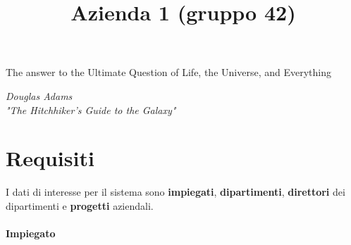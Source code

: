 \documentclass{article}
\title{Azienda 1 (gruppo 42)}
\date{}
\begin{document}
\maketitle

 \epigraph{The answer to the Ultimate Question of Life, the Universe, and Everything}{\textit{Douglas Adams \\ "The Hitchhiker's Guide to the Galaxy"}}



\section{Requisiti}

I dati di interesse per il sistema sono \textbf{impiegati}, \textbf{dipartimenti}, \textbf{direttori} dei dipartimenti e \textbf{progetti} aziendali.

\paragraph{Impiegato}

\end{document}
